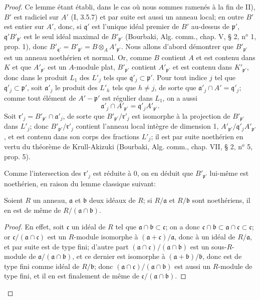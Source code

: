 \begin{proof}
Ce lemme étant établi, dans le cas où nous sommes ramenés à la fin de II),
$B'$ est radiciel sur $A'$ (I, 3.5.7) et par suite est aussi un anneau
local; en outre $B'$ est entier sur $A'$, donc, si $\mathfrak q'$ est
l'unique idéal premier de $B'$ au-dessus de $\mathfrak p'$,
$\mathfrak q'B'_{\mathfrak p'}$ est le seul idéal maximal de
$B'_{\mathfrak p'}$ (Bourbaki, Alg. comm., chap. V, § 2, n$^o$ 1, prop.
1), donc $B'_{\mathfrak q'}=B'_{\mathfrak p'}=B\otimes_A
A'_{\mathfrak p'}$. Nous allons d'abord démontrer que
$B'_{\mathfrak p'}$ est un anneau noethérien et normal. Or, comme $B$
contient $A$ et est contenu dans $K$ et que $A'_{\mathfrak p'}$ est un
$A$-module plat, $B'_{\mathfrak p'}$ contient $A'_{\mathfrak p'}$ et est
contenu dans $K'_{\mathfrak p'}$, donc dans le produit $L_1$ des $L'_j$
tels que $\mathfrak q'_j\subset\mathfrak p'$. Pour tout indice $j$ tel que
$\mathfrak q'_j\subset\mathfrak p'$, soit $\mathfrak a'_j$ le produit des
$L'_h$ tels que $h\neq j$, de sorte que
$\mathfrak a'_j\cap A'=\mathfrak q'_j$; comme tout élément de
$A'-\mathfrak p'$ est régulier dans $L_1$, on a aussi
\[
\mathfrak a'_j\cap A'_{\mathfrak p'}=
\mathfrak q'_jA'_{\mathfrak p'}.
\]
Soit $\mathfrak r'_j=B'_{\mathfrak p'}\cap\mathfrak a'_j$, de sorte que
$B'_{\mathfrak p'}/\mathfrak r'_j$ est isomorphe à la projection de
$B'_{\mathfrak p'}$ dans $L'_j$; donc $B'_{\mathfrak p'}/\mathfrak r'_j$
contient l'anneau local intègre de dimension 1,
$A'_{\mathfrak p'}/\mathfrak q'_jA'_{\mathfrak p'}$, et est contenu dans
son corps des fractions $L'_j$; il est par suite noethérien en vertu du
théorème de Krull-Akizuki (Bourbaki, Alg. comm., chap. VII, § 2, n$^o$ 5,
prop. 5).

Comme l'intersection des $\mathfrak r'_j$ est réduite à 0, on en déduit que
$B'_{\mathfrak p'}$ lui-même est noethérien, en raison du lemme classique
suivant:

\begin{lemma}[6.14.1.4]
\label{IV.2.s6.14.1.4-fr}
Soient $R$ un anneau, $\mathfrak a$ et $\mathfrak b$ deux idéaux de $R$; si
$R/\mathfrak a$ et $R/\mathfrak b$ sont noethériens, il en est de même de
$R/(\mathfrak a\cap\mathfrak b)$.
\end{lemma}

\begin{proof}
En effet, soit $\mathfrak c$ un idéal de $R$ tel que
$\mathfrak a\cap\mathfrak b\subset\mathfrak c$; on a donc
$\mathfrak c\cap\mathfrak b\subset\mathfrak a\cap\mathfrak c\subset
\mathfrak c$; or $\mathfrak c/(\mathfrak a\cap\mathfrak c)$ est un
$R$-module isomorphe à $(\mathfrak a+\mathfrak c)/\mathfrak a$, donc à un
idéal de $R/\mathfrak a$, et par suite est de type fini; d'autre part
$(\mathfrak a\cap\mathfrak c)/(\mathfrak a\cap\mathfrak b)$ est un
sous-$R$-module de $\mathfrak a/(\mathfrak a\cap\mathfrak b)$, et ce
dernier est isomorphe à $(\mathfrak a+\mathfrak b)/\mathfrak b$, donc est
de type fini comme idéal de $R/\mathfrak b$; donc
$(\mathfrak a\cap\mathfrak c)/(\mathfrak a\cap\mathfrak b)$ est aussi un
$R$-module de type fini, et il en est finalement de même de
$\mathfrak c/(\mathfrak a\cap\mathfrak b)$.
\end{proof}


\end{proof}
